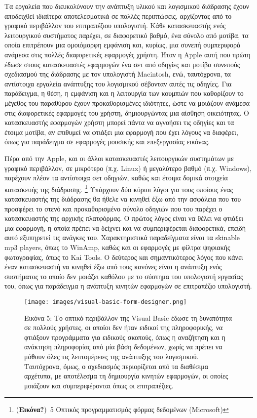 \documentclass[
]{article}
\begin{document}
Τα εργαλεία που διευκολύνουν την ανάπτυξη υλικού και λογισμικού
διάδρασης έχουν αποδειχθεί ιδιαίτερα αποτελεσματικά σε πολλές
περιπτώσεις, αρχίζοντας από το γραφικό περιβάλλον του επιτραπέζιου
υπολογιστή. Κάθε κατασκευαστής ενός λειτουργικού συστήματος παρέχει, σε
διαφορετικό βαθμό, ένα σύνολο από μοτίβα, τα οποία επιτρέπουν μια
ομοιόμορφη εμφάνιση και, κυρίως, μια συνεπή συμπεριφορά ανάμεσα στις
πολλές διαφορετικές εφαρμογές χρήστη. Ήταν η Apple αυτή που πρώτη έδωσε
στους κατασκευαστές εφαρμογών ένα σετ από οδηγίες και μοτίβα συνεπούς
σχεδιασμού της διάδρασης με τον υπολογιστή Macintosh, ενώ, ταυτόχρονα,
τα αντίστοιχα εργαλεία ανάπτυξης του λογισμικού σέβονταν αυτές τις
οδηγίες. Για παράδειγμα, η θέση, η εμφάνιση και η λειτουργία των
κουμπιών που καθορίζουν το μέγεθος του παραθύρου έχουν προκαθορισμένες
ιδιότητες, ώστε να μοιάζουν ανάμεσα στις διαφορετικές εφαρμογές του
χρήστη, δημιουργώντας μια αίσθηση οικειότητας. Ο κατασκευαστής εφαρμογών
χρήστη μπορεί πάντα να αγνοήσει τις οδηγίες και τα έτοιμα μοτίβα, αν
επιθυμεί να φτιάξει μια εφαρμογή που έχει λόγους να διαφέρει, όπως για
παράδειγμα σε εφαρμογές μουσικής και επεξεργασίας εικόνας.

Πέρα από την Apple, και οι άλλοι κατασκευαστές λειτουργικών συστημάτων
με γραφικό περιβάλλον, σε μικρότερο (π.χ. Linux) ή μεγαλύτερο βαθμό
(π.χ. Windows), παρέχουν πλέον τα αντίστοιχα σετ οδηγιών, καθώς και
έτοιμα δομικά στοιχεία κατασκευής της διάδρασης. \footnote{(\textbf{Εικόνα?})~5
  Οπτικός προγραμματισμός φόρμας δεδομένων (Microsoft)} Υπάρχουν δύο
κύριοι λόγοι για τους οποίους ένας κατασκευαστής της διάδρασης θα ήθελε
να κινηθεί έξω από την ασφάλεια που του προσφέρει το στενό και
προκαθορισμένο σύνολο οδηγιών που του παρέχει ο κατασκευαστής της
αρχικής πλατφόρμας. Ο πρώτος λόγος είναι να θέλει να φτιάξει μια
εφαρμογή, η οποία πρέπει να δείχνει και να συμπεριφέρεται διαφορετικά,
επειδή αυτό εξυπηρετεί τις ανάγκες του. Χαρακτηριστικά παραδείγματα
είναι τα skinable mp3 players, όπως το WinAmp, καθώς και οι εφαρμογές με
φίλτρα ψηφιακής φωτογραφίας, όπως το Kai Tools. Ο δεύτερος και
σημαντικότερος λόγος που κάνει έναν κατασκευαστή να κινηθεί έξω από τους
κανόνες είναι η ανάπτυξη ενός συστήματος το οποίο δεν μοιάζει καθόλου με
το σύστημα του υπολογιστή εργασίας του, όπως για παράδειγμα η ανάπτυξη
κινητών εφαρμογών σε επιτραπέζιο υπολογιστή.

\leavevmode{}%
\begin{figure}
\hypertarget{fig:visual-basic-form-designer}{%
\centering
\texttt{[image: images/visual-basic-form-designer.png]}
\caption{Εικόνα 5: Το οπτικό περιβάλλον της Visual Basic έδωσε τη
δυνατότητα σε πολλούς χρήστες, οι οποίοι δεν ήταν ειδικοί της
πληροφορικής, να φτιάξουν προγράμματα για ειδικούς σκοπούς, όπως η
αναζήτηση και η ανάκτηση πληροφορίας από μία βάση δεδομένων, χωρίς να
πρέπει να μάθουν όλες τις λεπτομέρειες της ανάπτυξης του λογισμικού.
Ταυτόχρονα, όμως, ο σχεδιασμός περιορίζεται από τα διαθέσιμα αρχέτυπα,
με αποτέλεσμα τη δημιουργία κινητών εφαρμογών, οι οποίες μοιάζουν και
συμπεριφέρονται όπως οι
επιτραπέζιες.}\label{fig:visual-basic-form-designer}
}
\end{figure}
\end{document}

